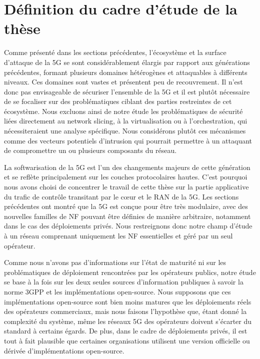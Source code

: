 \documentclass[a4paper,11pt,twoside]{StyleThese}
\begin{document}
\section{Définition du cadre d'étude de la thèse}

Comme présenté dans les sections précédentes, l’écosystème et la surface d’attaque de la 5G se sont considérablement élargis par rapport aux générations précédentes, formant plusieurs domaines hétérogènes et attaquables à différents niveaux. Ces domaines sont vastes et présentent peu de recouvrement. Il n’est donc pas envisageable de sécuriser l’ensemble de la 5G et il est plutôt nécessaire de se focaliser sur des problématiques ciblant des parties restreintes de cet écosystème. Nous excluons ainsi de notre étude les problématiques de sécurité liées directement au network slicing, à la virtualisation ou à l’orchestration, qui nécessiteraient une analyse spécifique. Nous considérons plutôt ces mécanismes comme des vecteurs potentiels d’intrusion qui pourrait permettre à un attaquant de compromettre un ou plusieurs composants du réseau.

La softwarisation de la 5G est l’un des changements majeurs de cette génération et se reflète principalement sur les couches protocolaires hautes. C’est pourquoi nous avons choisi de concentrer le travail de cette thèse sur la partie applicative du trafic de contrôle transitant par le cœur et le RAN de la 5G. Les sections précédentes ont montré que la 5G est conçue pour être très modulaire, avec des nouvelles familles de NF pouvant être définies de manière arbitraire, notamment dans le cas des déploiements privés. Nous restreignons donc notre champ d’étude à un réseau comprenant uniquement les NF essentielles et géré par un seul opérateur. 

Comme nous n’avons pas d’informations sur l’état de maturité ni sur les problématiques de déploiement rencontrées par les opérateurs publics, notre étude se base à la fois sur les deux seules sources d'information publiques à savoir la norme 3GPP et les implémentations open-source. Nous supposons que ces implémentations open-source sont bien moins matures que les déploiements réels des opérateurs commerciaux, mais nous faisons l'hypothèse que, étant donné la complexité du système, même les réseaux 5G des opérateurs doivent s’écarter du standard à certains égards. De plus, dans le cadre de déploiements privés, il est tout à fait plausible que certaines organisations utilisent une version officielle ou dérivée d'implémentations open-source.
\end{document}
